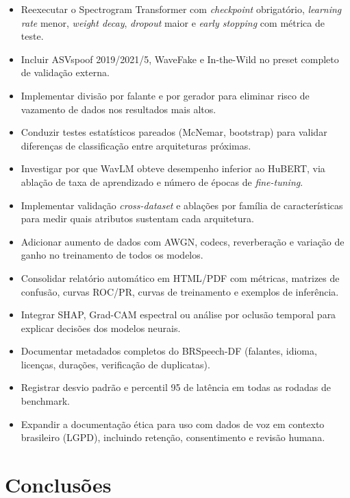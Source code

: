 \documentclass[12pt,a4paper]{article}
\begin{document}
\begin{itemize}
    \item Reexecutar o Spectrogram Transformer com \textit{checkpoint}
    obrigatório, \textit{learning rate} menor, \textit{weight decay},
    \textit{dropout} maior e \textit{early stopping} com métrica de teste.
    \item Incluir ASVspoof 2019/2021/5, WaveFake e In-the-Wild no preset
    completo de validação externa.
    \item Implementar divisão por falante e por gerador para eliminar risco
    de vazamento de dados nos resultados mais altos.
    \item Conduzir testes estatísticos pareados (McNemar, bootstrap) para
    validar diferenças de classificação entre arquiteturas próximas.
    \item Investigar por que WavLM obteve desempenho inferior ao HuBERT,
    via ablação de taxa de aprendizado e número de épocas de \textit{fine-tuning}.
    \item Implementar validação \textit{cross-dataset} e ablações por família
    de características para medir quais atributos sustentam cada arquitetura.
    \item Adicionar aumento de dados com AWGN, codecs, reverberação e
    variação de ganho no treinamento de todos os modelos.
    \item Consolidar relatório automático em HTML/PDF com métricas, matrizes
    de confusão, curvas ROC/PR, curvas de treinamento e exemplos de inferência.
    \item Integrar SHAP, Grad-CAM espectral ou análise por oclusão temporal
    para explicar decisões dos modelos neurais.
    \item Documentar metadados completos do BRSpeech-DF (falantes, idioma,
    licenças, durações, verificação de duplicatas).
    \item Registrar desvio padrão e percentil 95 de latência em todas as
    rodadas de benchmark.
    \item Expandir a documentação ética para uso com dados de voz em contexto
    brasileiro (LGPD), incluindo retenção, consentimento e revisão humana.
\end{itemize}

\section{Conclusões}
\label{sec:conclusao}
\end{document}
